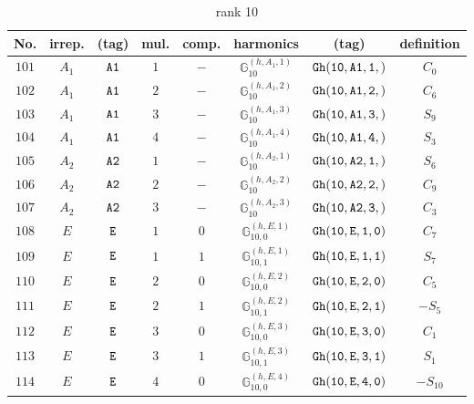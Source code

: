 \documentclass[fleqn,8pt]{jsarticle}
\begin{document}
\begin{table}[ht!]
\begin{center}
\caption{rank 10}
\renewcommand{\arraystretch}{1.3}
\begin{tabular}{cccccccc} \hline \hline
No. & irrep. & (tag) & mul. & comp. & harmonics & (tag) & definition \\ \hline
$ 101 $ & $ A_{1} $ & $ {\tt A1} $ & $ 1 $ & $ - $ & $ \mathbb{G}_{10}^{(h,A_{1},1)} $ & $ {\tt Gh(10,A1,1,)} $ & $ C_{0} $ \\
$ 102 $ & $ A_{1} $ & $ {\tt A1} $ & $ 2 $ & $ - $ & $ \mathbb{G}_{10}^{(h,A_{1},2)} $ & $ {\tt Gh(10,A1,2,)} $ & $ C_{6} $ \\
$ 103 $ & $ A_{1} $ & $ {\tt A1} $ & $ 3 $ & $ - $ & $ \mathbb{G}_{10}^{(h,A_{1},3)} $ & $ {\tt Gh(10,A1,3,)} $ & $ S_{9} $ \\
$ 104 $ & $ A_{1} $ & $ {\tt A1} $ & $ 4 $ & $ - $ & $ \mathbb{G}_{10}^{(h,A_{1},4)} $ & $ {\tt Gh(10,A1,4,)} $ & $ S_{3} $ \\
$ 105 $ & $ A_{2} $ & $ {\tt A2} $ & $ 1 $ & $ - $ & $ \mathbb{G}_{10}^{(h,A_{2},1)} $ & $ {\tt Gh(10,A2,1,)} $ & $ S_{6} $ \\
$ 106 $ & $ A_{2} $ & $ {\tt A2} $ & $ 2 $ & $ - $ & $ \mathbb{G}_{10}^{(h,A_{2},2)} $ & $ {\tt Gh(10,A2,2,)} $ & $ C_{9} $ \\
$ 107 $ & $ A_{2} $ & $ {\tt A2} $ & $ 3 $ & $ - $ & $ \mathbb{G}_{10}^{(h,A_{2},3)} $ & $ {\tt Gh(10,A2,3,)} $ & $ C_{3} $ \\
$ 108 $ & $ E $ & $ {\tt E} $ & $ 1 $ & $ 0 $ & $ \mathbb{G}_{10,0}^{(h,E,1)} $ & $ {\tt Gh(10,E,1,0)} $ & $ C_{7} $ \\
$ 109 $ & $ E $ & $ {\tt E} $ & $ 1 $ & $ 1 $ & $ \mathbb{G}_{10,1}^{(h,E,1)} $ & $ {\tt Gh(10,E,1,1)} $ & $ S_{7} $ \\
$ 110 $ & $ E $ & $ {\tt E} $ & $ 2 $ & $ 0 $ & $ \mathbb{G}_{10,0}^{(h,E,2)} $ & $ {\tt Gh(10,E,2,0)} $ & $ C_{5} $ \\
$ 111 $ & $ E $ & $ {\tt E} $ & $ 2 $ & $ 1 $ & $ \mathbb{G}_{10,1}^{(h,E,2)} $ & $ {\tt Gh(10,E,2,1)} $ & $ - S_{5} $ \\
$ 112 $ & $ E $ & $ {\tt E} $ & $ 3 $ & $ 0 $ & $ \mathbb{G}_{10,0}^{(h,E,3)} $ & $ {\tt Gh(10,E,3,0)} $ & $ C_{1} $ \\
$ 113 $ & $ E $ & $ {\tt E} $ & $ 3 $ & $ 1 $ & $ \mathbb{G}_{10,1}^{(h,E,3)} $ & $ {\tt Gh(10,E,3,1)} $ & $ S_{1} $ \\
$ 114 $ & $ E $ & $ {\tt E} $ & $ 4 $ & $ 0 $ & $ \mathbb{G}_{10,0}^{(h,E,4)} $ & $ {\tt Gh(10,E,4,0)} $ & $ - S_{10} $ \\

\end{tabular}
\end{center}
\end{table}
\end{document}
